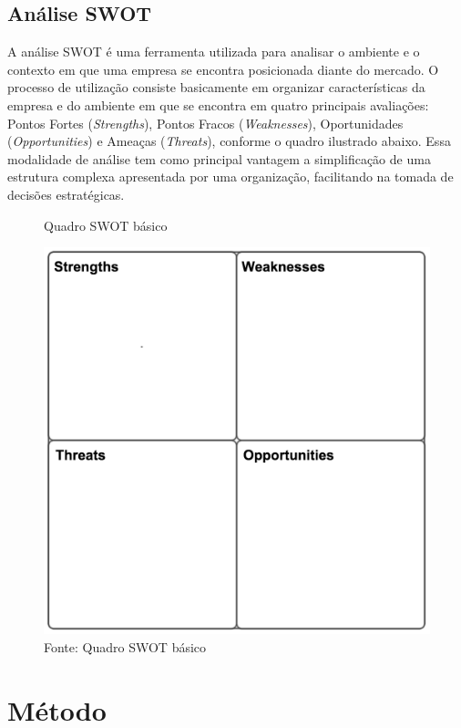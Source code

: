 \subsection{Análise SWOT}
\label{cha:analise_swot}

A análise SWOT é uma ferramenta utilizada para analisar o ambiente e o contexto em que uma empresa se encontra posicionada diante do mercado. O processo de utilização consiste basicamente em organizar características da empresa e do ambiente em que se encontra em quatro principais avaliações: Pontos Fortes (\textit{Strengths}), Pontos Fracos (\textit{Weaknesses}), Oportunidades (\textit{Opportunities}) e Ameaças (\textit{Threats}), conforme o quadro ilustrado abaixo. Essa modalidade de análise tem como principal vantagem a simplificação de uma estrutura complexa apresentada por uma organização, facilitando na tomada de decisões estratégicas.

\begin{figure}[H]
\caption{Quadro SWOT básico}
\centerline{\includegraphics[scale=0.5]{img/detailedswot}}
\label{fig:detailedswot}
\caption* {Fonte: Quadro SWOT básico}
\end{figure}

\section{Método}

